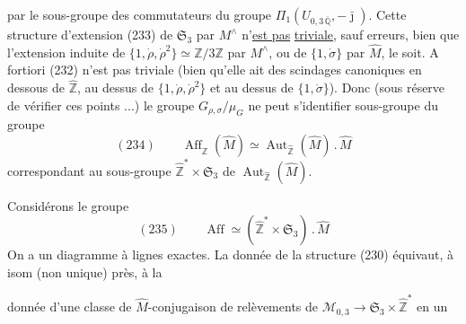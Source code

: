 par le sous-groupe  des commutateurs
du groupe $\Pi_1(U_{0,3\,\overline{\mathbb Q}},-\bar{\jmath})$.
Cette  structure d'extension (233) de $\mathfrak S_3$
par $M^\wedge$ n'\uline{est pas} \uline{triviale}, sauf erreurs,
bien que l'extension induite de
$\{1,\dot\rho,\dot\rho^2\}\simeq\mathbb Z/3\mathbb Z$ par $M^\wedge$,
ou de $\{1,\dot\sigma\}$ par $\widehat M$, le soit.
A fortiori (232) n'est pas triviale (bien qu'elle ait des scindages
canoniques en dessous de $\widehat{\mathbb Z}$, au dessus de
$\{1,\dot\rho,\dot\rho^2\}$ et au dessus de $\{1,\dot\sigma\}$).
Donc (sous réserve de vérifier ces points ...)
le groupe $G_{\rho,\sigma}/\mu_G$ ne peut s'identifier
 sous-groupe du groupe 
\[
(234)\qquad
\boxed{\operatorname{Aff}_{\widehat{\mathbb Z}}(\widehat M)
\simeq\operatorname{Aut}_{\widehat{\mathbb Z}}(\widehat M)\mathbin{.}\widehat M}
\]
correspondant au sous-groupe $\widehat{\mathbb Z}^{*}\times\mathfrak S_3$
de $\operatorname{Aut}_{\widehat{\mathbb Z}}(\widehat M)$.

 Considérons le groupe
\[
(235)\qquad
\operatorname{Aff}\simeq
(\widehat{\mathbb Z}^{*}\times\mathfrak S_3)\mathbin{.}\widehat M
\]
On a un diagramme
à lignes exactes. La donnée de la structure (230) équivaut,
à isom (non unique) près, à la



donnée d'une classe de $\widehat M$-conjugaison de relèvements
de $\mathcal M_{0,3}\longrightarrow\mathfrak S_3\times\widehat{\mathbb Z}^{*}$
en un

